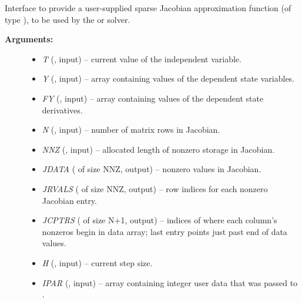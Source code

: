 \documentclass[letterpaper,10pt,english]{sphinxmanual}
\begin{document}
\begin{fulllineitems}
\label{f_interface/Usage:f/_/FARKSPJAC}
Interface to provide a user-supplied sparse Jacobian approximation
function (of type {\hyperref[c_interface/User_supplied:ARKSlsSparseJacFn]{}}), to be used by the
{\hyperref[f_interface/Usage:f/_/FARKKLU]{}} or {\hyperref[f_interface/Usage:f/_/FARKSUPERLUMT]{}} solver.
\begin{description}
\item[{\textbf{Arguments:}}] \leavevmode\begin{itemize}
\item {} 
\emph{T} (, input) -- current value of the independent variable.

\item {} 
\emph{Y} (, input) -- array containing values of the dependent state variables.

\item {} 
\emph{FY} (, input) -- array containing values of the dependent state derivatives.

\item {} 
\emph{N} (, input) -- number of matrix rows in Jacobian.

\item {} 
\emph{NNZ} (, input) -- allocated length of nonzero storage in Jacobian.

\item {} 
\emph{JDATA} ( of size NNZ, output) -- nonzero values in Jacobian.

\item {} 
\emph{JRVALS} ( of size NNZ, output) -- row indices for each
nonzero Jacobian entry.

\item {} 
\emph{JCPTRS} ( of size N+1, output) -- indices of where
each column's nonzeros begin in data array; last entry points
just past end of data values.

\item {} 
\emph{H} (, input) -- current step size.

\item {} 
\emph{IPAR} (, input) -- array containing integer user data that was passed to
{\hyperref[f_interface/Usage:f/_/FARKMALLOC]{}}.


\end{itemize}
\end{description}
\end{fulllineitems}
\end{document}
